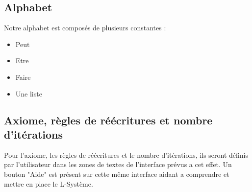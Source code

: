 \subsection{Alphabet}
Notre alphabet est composés de plusieurs constantes :
\begin{itemize}[label=\textbullet]
    \item Peut
    \item Etre
    \item Faire
    \item Une liste
\end{itemize}
\subsection{Axiome, règles de réécritures et nombre d'itérations}
Pour l'axiome, les règles de réécritures et le nombre d'itérations, ils seront définis par l'utilisateur dans les zones de textes de l'interface prévus a cet effet. 
Un bouton "Aide" est présent sur cette même interface aidant a comprendre et mettre en place le L-Système.
